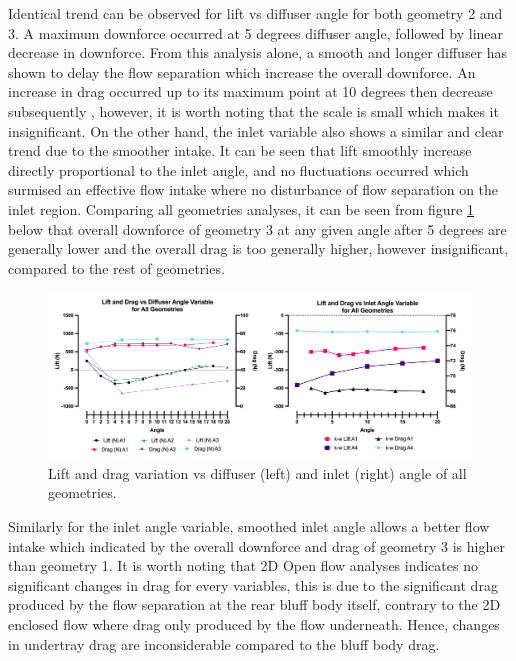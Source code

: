 \noindent Identical trend can be observed for lift vs diffuser angle for both geometry 2 and 3. A maximum downforce occurred at 5 degrees diffuser angle, followed by linear decrease in downforce. From this analysis alone, a smooth and longer diffuser has shown to delay the flow separation which increase the overall downforce. An increase in drag occurred up to its maximum point at 10 degrees then decrease  subsequently , however, it is worth noting that the scale is small which makes it insignificant. On the other hand, the inlet variable also shows a similar and clear trend due to the smoother intake. It can be seen that lift smoothly increase directly proportional to the inlet angle, and no fluctuations occurred which surmised  an effective flow intake where no disturbance of flow separation on the inlet region. Comparing all geometries analyses, it can be seen from figure \ref{fig:2D_OF_PLOT_COMPARE_ALL} below that overall downforce of geometry 3 at any given angle after 5 degrees are generally lower and the overall drag is too generally higher, however insignificant, compared to the rest of geometries.

\begin{figure}[htb!]
    \centering
    \includegraphics[scale=0.9]{Figures/2D_OF/2D_OF_PLOT_COMPARE_ALL.png}
    \caption{Lift and drag variation vs diffuser (left) and inlet (right) angle of all geometries.}
    \label{fig:2D_OF_PLOT_COMPARE_ALL}
\end{figure}

\noindent Similarly for the inlet angle variable, smoothed inlet angle allows a better flow intake which indicated by the overall downforce and drag of geometry 3 is higher than geometry 1. It is worth noting that 2D Open flow analyses indicates no significant changes in drag for every variables, this is due to the significant drag produced by the flow separation at the rear bluff body itself, contrary to the 2D enclosed flow where drag only produced by the flow underneath. Hence, changes in undertray drag are inconsiderable compared to the bluff body drag.



